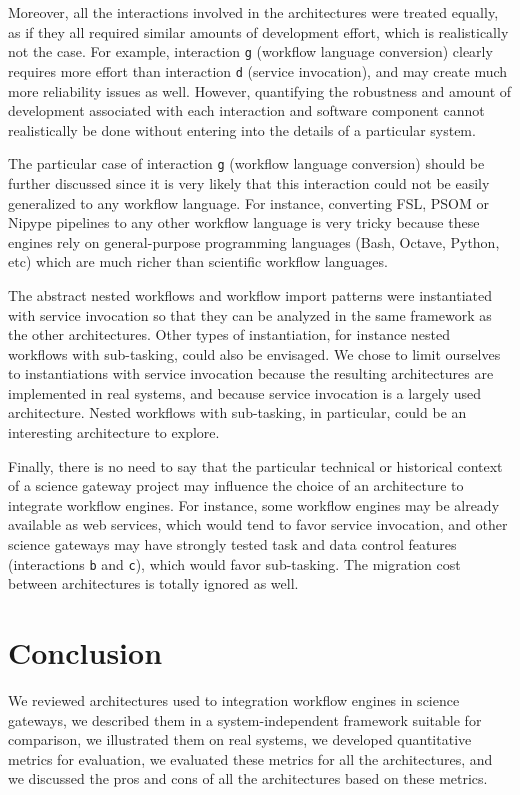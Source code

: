 \documentclass[preprint,3p,twocolumn]{elsarticle}
\begin{document}
Moreover, all the interactions involved in the architectures were
treated equally, as if they all required similar amounts of
development effort, which is realistically not the case. For example,
interaction \texttt{g} (workflow language conversion) clearly requires
more effort than interaction \texttt{d} (service invocation), and may
create much more reliability issues as well. However, quantifying the
robustness and amount of development associated with each interaction
and software component cannot realistically be done without entering
into the details of a particular system.

The particular case of interaction \texttt{g} (workflow language
conversion) should be further discussed since it is very likely that
this interaction could not be easily generalized to any workflow
language. For instance, converting FSL, PSOM or Nipype pipelines to
any other workflow language is very tricky because these engines rely
on general-purpose programming languages (Bash, Octave, Python, etc)
which are much richer than scientific workflow languages.

The abstract nested workflows and workflow import patterns were
instantiated with service invocation so that they can be analyzed in
the same framework as the other architectures. Other types of
instantiation, for instance nested workflows with sub-tasking, could
also be envisaged. We chose to limit ourselves to instantiations with
service invocation because the resulting architectures are implemented in 
real systems, and because service invocation is a largely
used architecture. Nested workflows with sub-tasking, in particular,
could be an interesting architecture to explore. 

Finally, there is no need to say that the particular technical or
historical context of a science gateway project may influence the
choice of an architecture to integrate workflow engines. For instance,
some workflow engines may be already available as web services, which
would tend to favor service invocation, and other science gateways may
have strongly tested task and data control features (interactions
\texttt{b} and \texttt{c}), which would favor sub-tasking. The
migration cost between architectures is totally ignored as well.

\section{Conclusion}

We reviewed architectures used to integration workflow engines in
science gateways, we described them in a system-independent framework
suitable for comparison, we illustrated them on real systems, we
developed quantitative metrics for evaluation, we evaluated these
metrics for all the architectures, and we discussed the pros and cons
of all the architectures based on these metrics.
\end{document}
